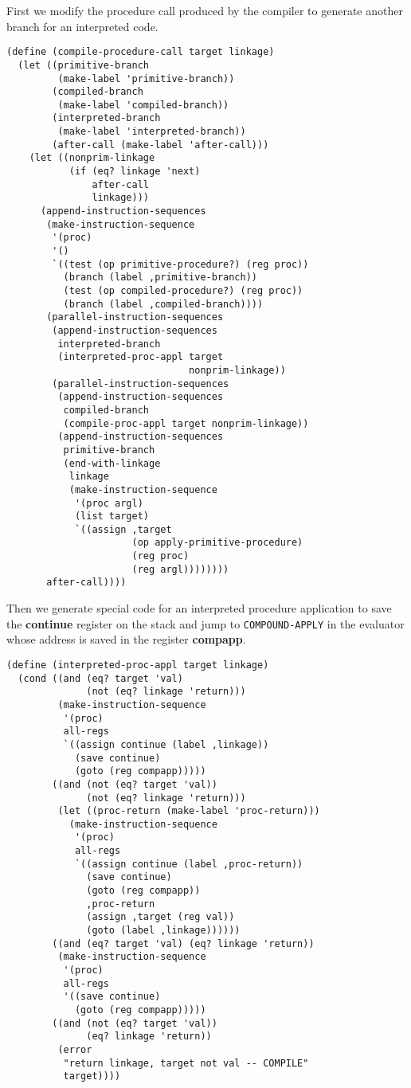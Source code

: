\documentclass[a4paper,12pt]{article}
\begin{document}
First we modify the procedure call produced by the compiler to
generate another branch for an interpreted code.

\begin{lstlisting}
(define (compile-procedure-call target linkage)
  (let ((primitive-branch
         (make-label 'primitive-branch))
        (compiled-branch
         (make-label 'compiled-branch))
        (interpreted-branch
         (make-label 'interpreted-branch))
        (after-call (make-label 'after-call)))
    (let ((nonprim-linkage
           (if (eq? linkage 'next)
               after-call
               linkage)))
      (append-instruction-sequences
       (make-instruction-sequence
        '(proc)
        '()
        `((test (op primitive-procedure?) (reg proc))
          (branch (label ,primitive-branch))
          (test (op compiled-procedure?) (reg proc))
          (branch (label ,compiled-branch))))
       (parallel-instruction-sequences
        (append-instruction-sequences
         interpreted-branch
         (interpreted-proc-appl target
                                nonprim-linkage))
        (parallel-instruction-sequences
         (append-instruction-sequences
          compiled-branch
          (compile-proc-appl target nonprim-linkage))
         (append-instruction-sequences
          primitive-branch
          (end-with-linkage
           linkage
           (make-instruction-sequence
            '(proc argl)
            (list target)
            `((assign ,target
                      (op apply-primitive-procedure)
                      (reg proc)
                      (reg argl))))))))
       after-call))))
\end{lstlisting}

Then we generate special code for an interpreted procedure application
to save the \textbf{continue} register on the stack and jump to
\lstinline!COMPOUND-APPLY! in the evaluator whose address is saved in
the register \textbf{compapp}.

\begin{lstlisting}
(define (interpreted-proc-appl target linkage)
  (cond ((and (eq? target 'val)
              (not (eq? linkage 'return)))
         (make-instruction-sequence
          '(proc)
          all-regs
          `((assign continue (label ,linkage))
            (save continue)
            (goto (reg compapp)))))
        ((and (not (eq? target 'val))
              (not (eq? linkage 'return)))
         (let ((proc-return (make-label 'proc-return)))
           (make-instruction-sequence
            '(proc)
            all-regs
            `((assign continue (label ,proc-return))
              (save continue)
              (goto (reg compapp))
              ,proc-return
              (assign ,target (reg val))
              (goto (label ,linkage))))))
        ((and (eq? target 'val) (eq? linkage 'return))
         (make-instruction-sequence
          '(proc)
          all-regs
          '((save continue)
            (goto (reg compapp)))))
        ((and (not (eq? target 'val))
              (eq? linkage 'return))
         (error
          "return linkage, target not val -- COMPILE"
          target))))
\end{lstlisting}
\end{document}
